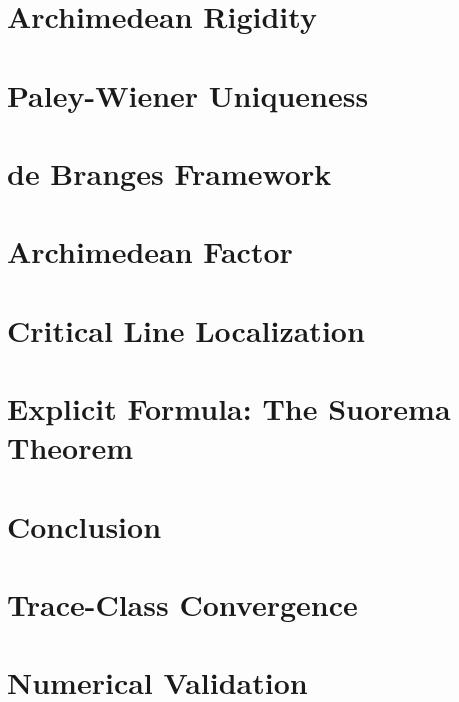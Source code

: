 \documentclass[12pt]{article}
\begin{document}
\section{Archimedean Rigidity}


\section{Paley-Wiener Uniqueness}


\section{de Branges Framework}


\section{Archimedean Factor}


\section{Critical Line Localization}


\section{Explicit Formula: The Suorema Theorem}


\section{Conclusion}


\appendix

\section{Trace-Class Convergence}


\section{Numerical Validation}

\end{document}
